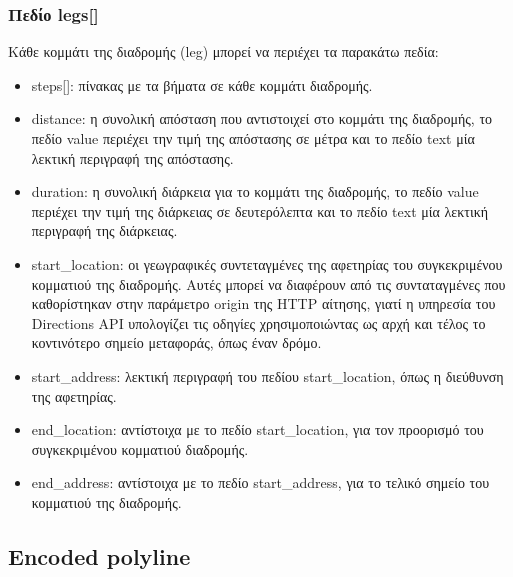 \subsubsection{Πεδίο legs[]}

Κάθε κομμάτι της διαδρομής (leg) μπορεί να περιέχει τα παρακάτω πεδία:

\begin{itemize}
 \item steps[]: πίνακας με τα βήματα σε κάθε κομμάτι διαδρομής.
 \item distance: η συνολική απόσταση που αντιστοιχεί στο κομμάτι της διαδρομής, το πεδίο value περιέχει την τιμή της απόστασης σε μέτρα και το πεδίο text μία λεκτική περιγραφή της 
 απόστασης.
 \item duration: η συνολική διάρκεια για το κομμάτι της διαδρομής, το πεδίο value περιέχει την τιμή της διάρκειας σε δευτερόλεπτα και το πεδίο text μία 
 λεκτική περιγραφή της διάρκειας. 
 \item start\_location: οι γεωγραφικές συντεταγμένες της αφετηρίας του συγκεκριμένου κομματιού της διαδρομής. Αυτές μπορεί να διαφέρουν από τις συνταταγμένες που 
 καθορίστηκαν στην παράμετρο origin της HTTP αίτησης, γιατί η υπηρεσία του Directions API υπολογίζει τις οδηγίες χρησιμοποιώντας ως αρχή και τέλος το κοντινότερο σημείο 
 μεταφοράς, όπως έναν δρόμο.
 \item start\_address: λεκτική περιγραφή του πεδίου start\_location, όπως η διεύθυνση της αφετηρίας.
 \item end\_location: αντίστοιχα με το πεδίο start\_location, για τον προορισμό του συγκεκριμένου κομματιού διαδρομής.
 \item end\_address: αντίστοιχα με το πεδίο start\_address, για το τελικό σημείο του κομματιού της διαδρομής.
\end{itemize}


\subsection{Encoded polyline}













